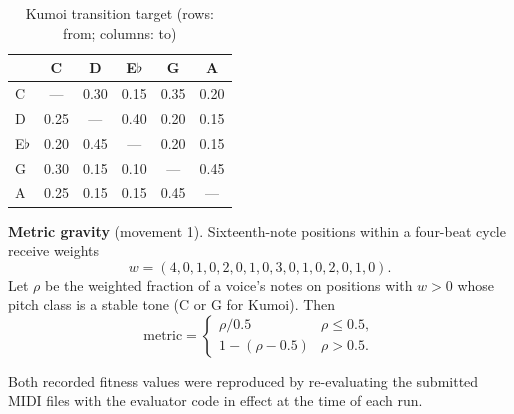 \documentclass[conference]{IEEEtran}
\newcommand{\fl}{$\flat$}
\begin{document}
\begin{table}[h]
\centering
\footnotesize
\caption{Kumoi transition target (rows: from; columns: to)}
\label{tab:kumoi}
\begin{tabular}{@{}lccccc@{}}
\toprule
 & C & D & E\fl & G & A \\
\midrule
C   & --- & 0.30 & 0.15 & 0.35 & 0.20 \\
D   & 0.25 & --- & 0.40 & 0.20 & 0.15 \\
E\fl & 0.20 & 0.45 & --- & 0.20 & 0.15 \\
G   & 0.30 & 0.15 & 0.10 & --- & 0.45 \\
A   & 0.25 & 0.15 & 0.15 & 0.45 & --- \\
\bottomrule
\end{tabular}
\end{table}

\textbf{Metric gravity} (movement 1). Sixteenth-note positions within a four-beat cycle receive weights
\[
w = (4, 0, 1, 0, 2, 0, 1, 0, 3, 0, 1, 0, 2, 0, 1, 0).
\]
Let $\rho$ be the weighted fraction of a voice's notes on positions with $w > 0$ whose pitch class is a stable tone (C or G for Kumoi). Then
\begin{equation}
\text{metric} =
\begin{cases}
\rho / 0.5 & \rho \le 0.5, \\
1 - (\rho - 0.5) & \rho > 0.5.
\end{cases}
\end{equation}

Both recorded fitness values were reproduced by re-evaluating the submitted MIDI files with the evaluator code in effect at the time of each run.
\end{document}
